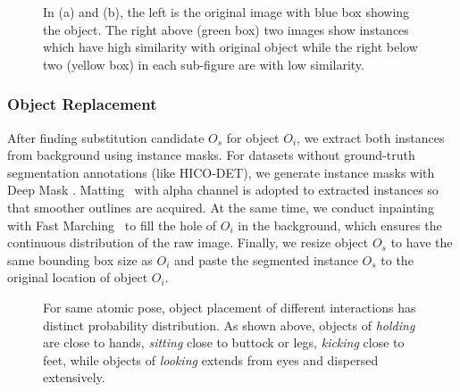\documentclass[10pt,twocolumn,letterpaper]{article}
\begin{document}
\begin{figure}[tb!]
\centering
{}
\caption{In (a) and (b), the left is the original image with blue box showing the object. The right above (green box) two images show instances which have high similarity with original object while the right below two (yellow box) in each sub-figure are with low similarity.}
\label{fig:object similarity}
\end{figure}

\subsubsection{Object Replacement}
After finding substitution candidate $O_s$ for object $O_i$, we extract both instances from background using instance masks. For datasets without ground-truth segmentation annotations (like HICO-DET), we generate instance masks with Deep Mask \cite{DBLP:journals/corr/PinheiroCD15}. Matting~\cite{he2011global} with alpha channel is adopted to extracted instances so that smoother outlines are acquired. At the same time, we conduct inpainting with Fast Marching~\cite{bertalmio2001navier} to fill the hole of $O_i$ in the background, which ensures the continuous distribution of the raw image. Finally, we resize object $O_s$ to have the same bounding box size as $O_i$ and paste the segmented instance $O_s$ to the original location of object $O_i$.

\begin{figure}[tb!]
\centering
{}

\caption{For same atomic pose, object placement of different interactions has distinct probability distribution. As shown above, objects of \textit{holding} are close to hands, \textit{sitting} close to buttock or legs, \textit{kicking} close to feet, while objects of \textit{looking} extends from eyes and dispersed extensively.}
\label{fig:person map}
\end{figure}
\end{document}
